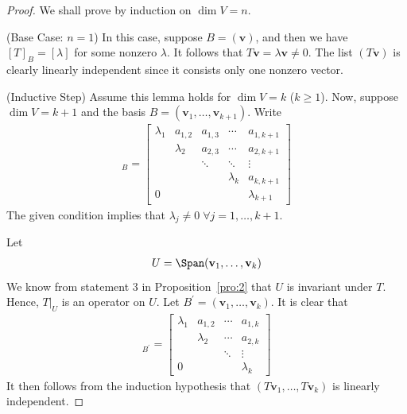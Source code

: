 \documentclass[thmcnt=section, color=blue, 12pt]{my-elegantbook}
\begin{document}
\begin{proof}
    We shall prove by induction on $\dim V = n$. 

    \par (Base Case: $n = 1$) In this case, suppose $B = (\mathbf{v})$, and then we have $[T]_B = [\lambda]$ for some nonzero $\lambda$. It follows that $T \mathbf{v} = \lambda \mathbf{v} \neq 0$. The list $(T \mathbf{v})$ is clearly linearly independent since it consists only one nonzero vector.

    \par (Inductive Step) Assume this lemma holds for $\dim V = k$ ($k \geq 1$). Now, suppose $\dim V = k+1$ and the basis $B = (\mathbf{v}_1, \ldots, \mathbf{v}_{k+1})$. Write
    \begin{align}
        [T]_B = \begin{bmatrix}
            \lambda_1 & a_{1,2} & a_{1,3} & \cdots & a_{1,k+1} \\ 
            & \lambda_2  & a_{2,3} &  \cdots & a_{2,k+1} \\
            & & \ddots & \ddots & \vdots\\
            & & & \lambda_{k} & a_{k,k+1}\\ 
            0 & & & & \lambda_{k+1}
        \end{bmatrix}
        \label{eq:8}
    \end{align}
    The given condition implies that $\lambda_j \neq 0 \; \forall j=1, \ldots, k+1$.
    
    \par Let 
    \begin{align*}
        U = \Span(\mathbf{v}_1, \ldots, \mathbf{v}_k)
    \end{align*}
    We know from statement 3 in Proposition~\ref{pro:2} that $U$ is invariant under $T$. Hence, $T|_U$ is an operator on $U$. Let $B^\prime = (\mathbf{v}_1, \ldots, \mathbf{v}_k)$. It is clear that 
    \begin{align*}
        [T|_U]_{B^\prime} = \begin{bmatrix}
            \lambda_1 & a_{1,2} & \cdots & a_{1,k} \\ 
            & \lambda_2  &  \cdots & a_{2,k} \\
            & & \ddots & \vdots\\
            0 & & & \lambda_{k} 
        \end{bmatrix}
    \end{align*}
    It then follows from the induction hypothesis that $(T \mathbf{v}_1, \ldots, T \mathbf{v}_k)$ is linearly independent.


\end{proof}
\end{document}
